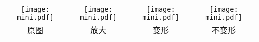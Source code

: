 \centering
\begin{tabular}{cccc}
  \texttt{[image: mini.pdf]} & 
  \texttt{[image: mini.pdf]} &
  \texttt{[image: mini.pdf]} &
  \texttt{[image: mini.pdf]} \\
  原图 & 放大 & 变形 & 不变形 \\
\end{tabular}
